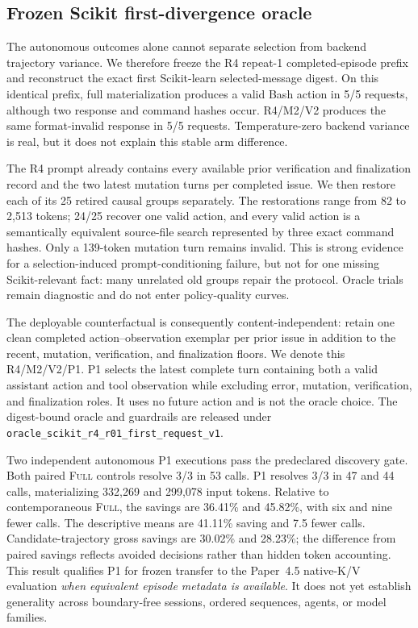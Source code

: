 \documentclass[11pt]{article}
\begin{document}
\subsection{Frozen Scikit first-divergence oracle}

The autonomous outcomes alone cannot separate selection from backend
trajectory variance.  We therefore freeze the R4 repeat-1 completed-episode
prefix and reconstruct the exact first Scikit-learn selected-message digest.
On this identical prefix, full materialization produces a valid Bash action in
5/5 requests, although two response and command hashes occur.  R4/M2/V2
produces the same format-invalid response in 5/5 requests.  Temperature-zero
backend variance is real, but it does not explain this stable arm difference.

The R4 prompt already contains every available prior verification and
finalization record and the two latest mutation turns per completed issue.  We
then restore each of its 25 retired causal groups separately.  The restorations
range from 82 to 2,513 tokens; 24/25 recover one valid action, and every valid
action is a semantically equivalent source-file search represented by three
exact command hashes.  Only a 139-token mutation turn remains invalid.  This
is strong evidence for a selection-induced prompt-conditioning failure, but
not for one missing Scikit-relevant fact: many unrelated old groups repair the
protocol.  Oracle trials remain diagnostic and do not enter policy-quality
curves.

The deployable counterfactual is consequently content-independent: retain one
clean completed action--observation exemplar per prior issue in addition to
the recent, mutation, verification, and finalization floors.  We denote this
R4/M2/V2/P1.  P1 selects the latest complete turn containing both a valid
assistant action and tool observation while excluding error, mutation,
verification, and finalization roles.  It uses no future action and is not the
oracle choice.  The digest-bound oracle and
guardrails are released under
\texttt{oracle\_scikit\_r4\_r01\_first\_request\_v1}.

Two independent autonomous P1 executions pass the predeclared discovery gate.
Both paired \textsc{Full} controls resolve 3/3 in 53 calls.  P1 resolves 3/3
in 47 and 44 calls, materializing 332,269 and 299,078 input tokens.  Relative
to contemporaneous \textsc{Full}, the savings are 36.41\% and 45.82\%, with
six and nine fewer calls.  The descriptive means are 41.11\% saving and 7.5
fewer calls.  Candidate-trajectory gross savings are 30.02\% and 28.23\%; the
difference from paired savings reflects avoided decisions rather than hidden
token accounting.  This result qualifies P1 for frozen transfer to the
Paper~4.5 native-K/V evaluation \emph{when equivalent episode metadata is
available}.  It does not yet establish generality across boundary-free
sessions, ordered sequences, agents, or model families.
\end{document}
